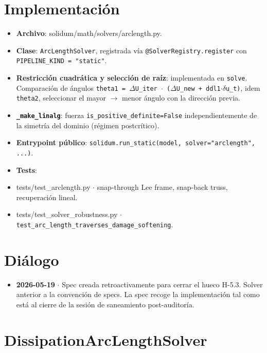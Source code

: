 \documentclass[11pt,letterpaper,oneside]{report}
\begin{document}
\section{Implementación}

\begin{itemize}
  \item \textbf{Archivo}: solidum/math/solvers/arclength.py.
  \item \textbf{Clase}: \texttt{ArcLengthSolver}, registrada vía \texttt{@SolverRegistry.register} con \texttt{PIPELINE\_KIND = "static"}.
  \item \textbf{Restricción cuadrática y selección de raíz}: implementada en \texttt{solve}. Comparación de ángulos \texttt{theta1 = \ensuremath{\Delta}U\_iter \ensuremath{\cdot} (\ensuremath{\Delta}U\_new + ddl1\ensuremath{\cdot}\ensuremath{\delta}u\_t)}, idem \texttt{theta2}, seleccionar el mayor \ensuremath{\to} menor ángulo con la dirección previa.
  \item \textbf{\texttt{\_make\_linalg}}: fuerza \texttt{is\_positive\_definite=False} independientemente de la simetría del dominio (régimen postcrítico).
  \item \textbf{Entrypoint público}: \texttt{solidum.run\_static(model, solver="arclength", ...)}.
  \item \textbf{Tests}:
  \item tests/test\_arclength.py \ensuremath{\cdot} snap-through Lee frame, snap-back truss, recuperación lineal.
  \item tests/test\_solver\_robustness.py \ensuremath{\cdot} \texttt{test\_arc\_length\_traverses\_damage\_softening}.
\end{itemize}


\section{Diálogo}

\begin{itemize}
  \item \textbf{2026-05-19} \ensuremath{\cdot} Spec creada retroactivamente para cerrar el hueco H-5.3. Solver anterior a la convención de specs. La spec recoge la implementación tal como está al cierre de la sesión de saneamiento post-auditoría.
\end{itemize}


\newpage

\section{DissipationArcLengthSolver}
\end{document}
